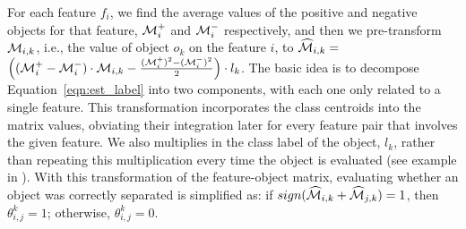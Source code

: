 {For each feature $f_i$, we find the average values of the positive and negative objects for that feature, ${\mathcal{M}}_i^+$ and ${\mathcal{M}}_i^-$ respectively, and then we pre-transform ${\mathcal{M}}_{i,k}$, i.e., the value of object $o_k$ on the feature $i$, to $\widehat{{\mathcal{M}}}_{i,k}=$ $\Big( ({\mathcal{M}}_i^+-{\mathcal{M}}_i^-)\cdot {\mathcal{M}}_{i,k}-\frac{({\mathcal{M}}_i^+)^2-({\mathcal{M}}_i^-)^2}{2} \Big) \cdot l_k$.
The basic idea is to decompose
Equation~\ref{eqn:est_label} into two components,
with each one only related to a single feature.
This transformation incorporates
the class centroids into the matrix values,
obviating their integration later
for every feature pair that involves the given feature.
We also multiplies
in the class label of the object, $l_k$,
rather than repeating this multiplication every time the object is evaluated (see example in \transfig). With this transformation of the feature-object matrix,
evaluating whether an object was correctly separated is simplified as: if $sign(\widehat{{\mathcal{M}}}_{i,k} + \widehat{{\mathcal{M}}}_{j,k}) = 1$, then $\theta_{i,j}^{k}=1$; otherwise, $\theta_{i,j}^{k}=0$. }
